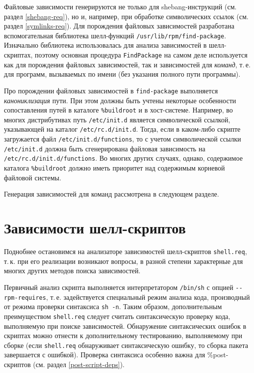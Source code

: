 \documentclass[russian,a4paper,12pt,titlepage]{article}
\begin{document}
Файловые зависимости генерируются не только для shebang-инструкций (см. раздел \ref{shebang-req}),
но и, например, при обработке символических ссылок (см. раздел \ref{symlinks-req}).  Для порождения
файловых зависимостей разработана вспомогательная библиотека шелл-функций \verb|/usr/lib/rpm/find-package|.
Изначально библиотека использовалась для анализа зависимостей в шелл-скриптах, поэтому основная процедура
\verb|FindPackage| на самом деле используется как для порождения файловых зависимостей, так и зависимостей
для \textit{команд}, т.\,е. для программ, вызываемых по имени (без указания полного пути программы).

Про порождении файловых зависимостей в \verb|find-package| выполняется \textit{канониклизация} пути.
При этом должны быть учтены некоторые особенности сопоставления путей в каталоге \verb|%buildroot|
и в хост-системе.  Например, во многих дистрибутивах путь \verb|/etc/init.d| является символической
ссылкой, указывающей на каталог \verb|/etc/rc.d/init.d|.  Тогда, если в каком-либо скрипте загружается
файл \verb|/etc/init.d/functions|, то с учетом символической ссылки \verb|/etc/init.d|
должна быть сгенерирована файловая зависимость на \verb|/etc/rc.d/init.d/functions|.
Во многих других случаях, однако, содержимое каталога \verb|%buildroot| должно иметь приоритет над
содержимым корневой файловой системы.

Генерация зависимостей для команд рассмотрена в следующем разделе.

\section{Зависимости шелл-скриптов}
\label{shell-req}
Поднобнее остановимся на анализаторе зависимостей шелл-скриптов \verb|shell.req|, т.\,к. при
его реализации возникают вопросы, в разной степени характерные для многих других методов
поиска зависимостей.

Первичный анализ скрипта выполняется интерпретатором \verb|/bin/sh| с опцией \verb|--rpm-requires|,
т.\,е. задействуется специальный режим анализа кода, производный от режима проверки синтаксиса \verb|sh -n|.
Таким образом, дополнительным преимуществом \verb|shell.req| следует считать синтаксическую проверку
кода, выполняемую при поиске зависимостей.  Обнаружение синтаксических ошибок в скриптах можно отнести
к дополнительному тестированию, выполняемому при сборке (если \verb|shell.req| обнаруживает синтаксическую ошибку,
то сборка пакета завершается с ошибкой).  Проверка синтаксиса особенно важна для \%post-скриптов (см. раздел
\ref{post-script-deps}).
\end{document}
